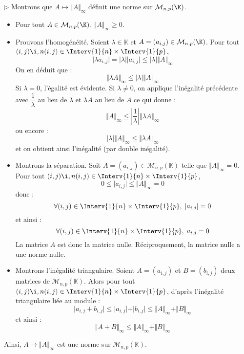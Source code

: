 \documentclass[a4paper,10pt]{report}
\begin{document}
\medskip

\noindent $\rhd$ Montrons que $A \mapsto \Vert A \Vert_{\infty}$ définit une norme sur $\mathcal{M}_{n,p}(\K)$.

\begin{itemize}
\item Pour tout $A \in \mathcal{M}_{n,p}(\K)$, $\Vert A \Vert_{\infty} \geq 0$.
\item Prouvons l'homogénéité. Soient $\lambda \in \mathbb{K}$ et $A=(a_{i,j}) \in \mathcal{M}_{n,p}(\K)$. Pour tout $(i,j) \i,n (i,j) \in \Interv{1}{n} \times \Interv{1}{p}$,
$$ \vert \lambda a_{i,j} \vert = \vert \lambda \vert \vert a_{i,j}\vert \leq \vert \lambda \vert \Vert A \Vert_{\infty}$$
On en déduit que :
$$ \Vert \lambda A \Vert_{\infty} \leq \vert \lambda \vert \Vert A \Vert_{\infty}$$
Si $\lambda = 0$, l'égalité est évidente. Si $\lambda \neq 0$, on applique l'inégalité précédente avec $\dfrac{1}{\lambda}$ au lieu de $\lambda$ et $\lambda A$ au lieu de $A$ ce qui donne :
$$ \Vert  A \Vert_{\infty} \leq \left\vert \dfrac{1}{\lambda} \right\vert \Vert \lambda A \Vert_{\infty}$$
ou encore :
$$ \vert \lambda \vert \Vert A \Vert_{\infty} \leq \Vert \lambda A \Vert_{\infty}$$
et on obtient ainsi l'inégalité (par double inégalité).


\item Montrons la séparation. Soit $A=(a_{i,j}) \in \mathcal{M}_{n,p}(\mathbb{K})$ telle que $\Vert A \Vert_{\infty}=0$. Pour tout $(i,j) \i,n (i,j) \in \Interv{1}{n} \times \Interv{1}{p}$,
$$ 0 \leq \vert a_{i,j} \vert \leq \Vert A \Vert_{\infty}=0$$
donc :
$$ \forall (i,j) \in \Interv{1}{n} \times \Interv{1}{p}, \; \vert a_{i,j} \vert =0$$
et ainsi :
$$  \forall (i,j) \in \Interv{1}{n} \times \Interv{1}{p}, \;  a_{i,j}  =0$$
La matrice $A$ est donc la matrice nulle. Réciproquement, la matrice nulle a une norme nulle.
\item Montrons l'inégalité triangulaire. Soient $A=(a_{i,j})$ et $B=(b_{i,j})$ deux matrices de $\mathcal{M}_{n,p}(\mathbb{K})$. Alors pour tout $(i,j) \i,n (i,j) \in \Interv{1}{n} \times \Interv{1}{p}$, d'après l'inégalité triangulaire liée au module :
$$ \vert a_{i,j} + b_{i,j} \vert \leq \vert a_{i,j} \vert + \vert b_{i,j} \vert \leq \Vert A \Vert_{\infty} + \Vert B \Vert_{\infty}$$
et ainsi :
$$ \Vert A+B \Vert_{\infty}  \leq \Vert A \Vert_{\infty} + \Vert B \Vert_{\infty}$$
\end{itemize}
Ainsi, $A \mapsto \Vert A \Vert_{\infty}$ est une norme sur $\mathcal{M}_{n,p}(\mathbb{K})$.
\end{document}
